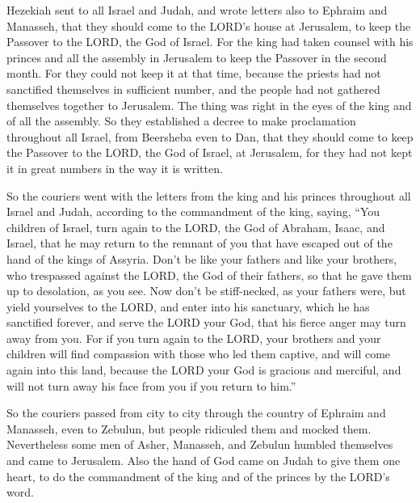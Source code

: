  Hezekiah sent to all Israel and Judah, and wrote letters
also to Ephraim and Manasseh, that they should come to the LORD's house
at Jerusalem, to keep the Passover to the LORD, the God of Israel.
 For the king had taken counsel with his princes and all
the assembly in Jerusalem to keep the Passover in the second month.
 For they could not keep it at that time, because the
priests had not sanctified themselves in sufficient number, and the
people had not gathered themselves together to Jerusalem. 
The thing was right in the eyes of the king and of all the assembly.
 So they established a decree to make proclamation
throughout all Israel, from Beersheba even to Dan, that they should come
to keep the Passover to the LORD, the God of Israel, at Jerusalem, for
they had not kept it in great numbers in the way it is written.

 So the couriers went with the letters from the king and
his princes throughout all Israel and Judah, according to the
commandment of the king, saying, ``You children of Israel, turn again to
the LORD, the God of Abraham, Isaac, and Israel, that he may return to
the remnant of you that have escaped out of the hand of the kings of
Assyria.  Don't be like your fathers and like your
brothers, who trespassed against the LORD, the God of their fathers, so
that he gave them up to desolation, as you see.  Now don't
be stiff-necked, as your fathers were, but yield yourselves to the LORD,
and enter into his sanctuary, which he has sanctified forever, and serve
the LORD your God, that his fierce anger may turn away from you.
 For if you turn again to the LORD, your brothers and your
children will find compassion with those who led them captive, and will
come again into this land, because the LORD your God is gracious and
merciful, and will not turn away his face from you if you return to
him.''

 So the couriers passed from city to city through the
country of Ephraim and Manasseh, even to Zebulun, but people ridiculed
them and mocked them.  Nevertheless some men of Asher,
Manasseh, and Zebulun humbled themselves and came to Jerusalem.
 Also the hand of God came on Judah to give them one
heart, to do the commandment of the king and of the princes by the
LORD's word.

